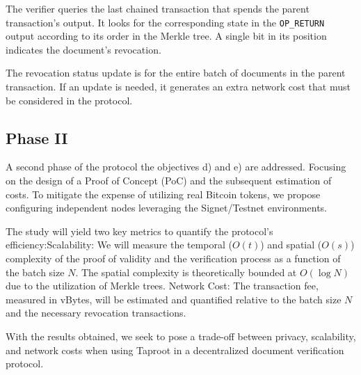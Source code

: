 The verifier queries the last chained transaction that spends the parent transaction's output.
It looks for the corresponding state in the \texttt{OP\_RETURN} output according to its order in the Merkle tree.
A single bit in its position indicates the document's revocation.

The revocation status update is for the entire batch of documents in the parent transaction.
If an update is needed, it generates an extra network cost that must be considered in the protocol.

\subsection{Phase II}

A second phase of the protocol the objectives d) and e) are addressed.
Focusing on the design of a Proof of Concept (PoC)  and the subsequent estimation of costs.
To mitigate the expense of utilizing real Bitcoin tokens, we propose configuring independent nodes leveraging the Signet/Testnet environments.

The study will yield two key metrics to quantify the protocol's efficiency:Scalability: We will measure the temporal ($O(t)$) and spatial ($O(s)$) complexity of the proof of validity and the verification process as a function of the batch size $N$. 
The spatial complexity is theoretically bounded at $O(\log N)$ due to the utilization of Merkle trees.
Network Cost: The transaction fee, measured in vBytes, will be estimated and quantified relative to the batch size $N$ and the necessary revocation transactions.


With the results obtained, we seek to pose a trade-off between privacy, scalability, and network costs when using Taproot in a decentralized document verification protocol.
